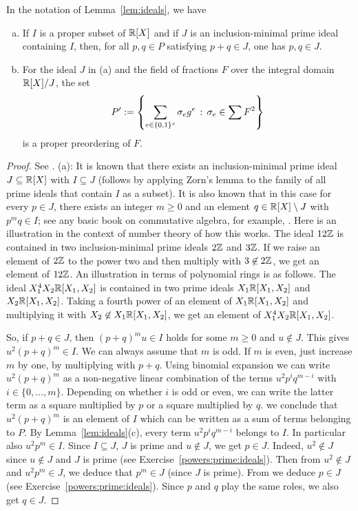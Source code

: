 \goodbreak
\begin{lemma}
	\label{lem:prime:ideals}
	In the notation of Lemma~\ref{lem:ideals}, we have 
	\begin{enumerate}[(a)]
		\item If $I$ is a proper subset of $\mathbb{R}[X]$ and if $J$ is an inclusion-minimal prime ideal containing $I$, then, for all $p,q \in P$ satisfying $p+q \in J$, one has $p, q \in J$. 
		\item For the ideal $J$ in (a) and the field of fractions $F$ over the integral domain $\mathbb{R}[X] / J$, the set
		\[
			P' := \left\{  \sum_{e \in \{0,1\}^s} \sigma_e g^e  \,:\, \sigma_e \in \sum F^2 \right\}
		\] 
		is a proper preordering of $F$.
	\end{enumerate}
\end{lemma}
\begin{proof} See \cite[Prop.~2.1.7]{Marshall:2008}. 
 (a): It is known that there exists an inclusion-minimal prime ideal $J \subseteq \mathbb{R}[X]$ with $I \subseteq J$ (follows by applying Zorn's lemma to the family of all prime ideals that contain $I$ as a subset). It is also known that in this case for every $p \in J$, there exists an integer $m \ge 0$ and an element $q \in \mathbb{R}[X] \setminus J$ with $p^m q \in I$; see any basic book on commutative algebra, for example, \cite[Prop.~1.14]{Atiyah:Macdonald:2016}. Here is an illustration in the context of number theory of how this works. The ideal $12 \mathbb{Z}$ is contained in two inclusion-minimal prime ideals $2 \mathbb{Z}$ and $3 \mathbb{Z}$. If we raise an element of $2 \mathbb{Z}$ to the power two and then multiply with $3 \not\in 2 \mathbb{Z}$, we get an element of $12 \mathbb{Z}$. An illustration in terms of polynomial rings is as follows. The ideal $X_1^4 X_2 \mathbb{R}[X_1,X_2]$ is contained in two prime ideals $X_1 \mathbb{R}[X_1,X_2]$ and $X_2 \mathbb{R}[X_1,X_2]$. Taking a fourth power of an element of $X_1 \mathbb{R}[X_1,X_2]$ and multiplying it with $X_2 \not\in X_1 \mathbb{R}[X_1,X_2]$, we get an element of $X_1^4 X_2 \mathbb{R}[X_1,X_2]$. 
 
 So, if $p+q \in J$, then $(p+q)^m u \in I$ holds for some $m \ge 0$ and $u \not\in J$. This gives $u^2 (p+q)^m \in I$. We can always assume that $m$ is odd. If $m$ is even, just increase $m$ by one, by multiplying with $p+q$.  Using binomial expansion we can write $u^2 (p+q)^m$ as a non-negative linear combination of the terms $u^2 p^i q^{m-i}$ with $i \in \{0,\ldots,m\}$. Depending on whether $i$ is odd or even, we can write the latter term as a square multiplied by $p$ or a square multiplied by $q$. we conclude that $u^2 (p+q)^m$ is an element of $I$ which can be written as a sum of terms belonging to $P$. By Lemma~\ref{lem:ideals}(c), every term $u^2 p^i q^{m-i}$ belongs to $I$. In particular also $u^2 p^m \in I$. Since $I \subseteq J$, $J$ is prime and $u \not \in J$, we get $p \in J$. Indeed, $u^2 \not \in J$ since $u \not\in J$ and $J$ is prime (see Exercise~\ref{powers:prime:ideals}). Then from $u^2 \not\in J$ and $u^2 p^m \in J$, we deduce that $p^m \in J$ (since $J$ is prime). From  we deduce $p \in J$ (see Exercise~\ref{powers:prime:ideals}). Since $p$ and $q$ play the same roles, we also get $q \in J$. 


\end{proof}
